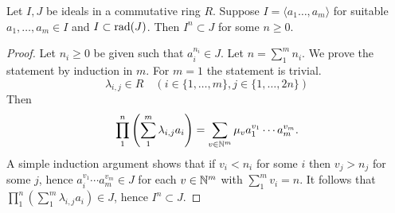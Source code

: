 \begin{lemma}\label{RadicalLemma}
    Let $I,J$ be ideals in a commutative ring $R$. Suppose $I=\langle a_1\dots,a_m\rangle $ for suitable $a_1,\dots,a_m\in I$ and $I\subset \mathrm{rad}(J)$. Then $I^n \subset J$ for some $n\geq 0$.
\end{lemma}
\begin{proof}
     Let $n_i\geq 0$ be given such that $a_i^{n_i}\in J$. Let $n=\sum_1^m n_i$. We prove the statement by induction in $m$. For $m=1$ the statement is trivial. 
     $$\lambda_{i,j}\in R\quad (i\in\{1,\dots, m\}, j\in\{1,\dots,2n\})$$
     Then 
     $$\prod_1^{n} \left(\sum_1^{m} \lambda_{i,j}a_i\right) = \sum_{v\in \mathbb{N}^m} \mu_v a_1^{v_1}\cdots a_m^{v_m}.$$
     A simple induction argument shows that if $v_i< n_i$ for some $i$ then $v_j>n_j$ for some $j$, hence $a_i^{v_1}\cdots a_m^{v_m}\in J$ for each $v\in \mathbb{N}^m$ with $\sum_1^m v_i = n$. It follows that $\prod_1^{n} \left(\sum_1^{m} \lambda_{i,j}a_i\right)\in J$, hence $I^n\subset J$.
\end{proof}
